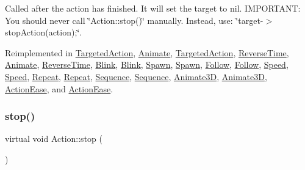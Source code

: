 Called after the action has finished. It will set the \textquotesingle{}target\textquotesingle{} to nil. I\+M\+P\+O\+R\+T\+A\+NT\+: You should never call \char`\"{}\+Action\+::stop()\char`\"{} manually. Instead, use\+: \char`\"{}target-\/$>$stop\+Action(action);\char`\"{}. 

Reimplemented in \hyperlink{classTargetedAction_a006f4ba95607369684770186588d12ce}{Targeted\+Action}, \hyperlink{classAnimate_acca8e3d000ced3182958b87e531ac423}{Animate}, \hyperlink{classTargetedAction_a688769917c245a9f885bbe49a73e37fa}{Targeted\+Action}, \hyperlink{classReverseTime_ab4fbd1a9abd412981366ae8a7782180e}{Reverse\+Time}, \hyperlink{classAnimate_a546b7b7817303ad58f57c6c97d64c4ed}{Animate}, \hyperlink{classReverseTime_af59bd73c03add3be189a371f5f338b72}{Reverse\+Time}, \hyperlink{classBlink_a081f03902fb69d5b4ec0fddf0ee72b60}{Blink}, \hyperlink{classBlink_ac2299db1e757e2911e35ee9c88fc477c}{Blink}, \hyperlink{classSpawn_a6b4b872928f24b722fda9d7428178a56}{Spawn}, \hyperlink{classSpawn_ab743d2f0b325be11b8939162d9d8984c}{Spawn}, \hyperlink{classFollow_af3b58aa360668e6e1203a48f23276b74}{Follow}, \hyperlink{classFollow_a2cd8dbd76066ecb517c6d5bdca032d6c}{Follow}, \hyperlink{classSpeed_a7580890ff2db1634273c0b726c023098}{Speed}, \hyperlink{classSpeed_afc0df0c91cfcb119182fec7ccf470f45}{Speed}, \hyperlink{classRepeat_a53b3a08574698685425cd7c55645e57a}{Repeat}, \hyperlink{classRepeat_ae7d7d020a49dbbe3ee160fe22db02ad2}{Repeat}, \hyperlink{classSequence_a66d72eff9f99dfff3f0ac09d280f4360}{Sequence}, \hyperlink{classSequence_a14332cc490ebbbb1c372eff0dc4cd025}{Sequence}, \hyperlink{classAnimate3D_af37f00e045b7dc5cd1a0c54a4f4f8042}{Animate3D}, \hyperlink{classAnimate3D_a9d27a950ce7942a73a392936951fc263}{Animate3D}, \hyperlink{classActionEase_a1a12083389f0bec7b1de3ef2c832597a}{Action\+Ease}, and \hyperlink{classActionEase_a2f9afe79f5848689a7f6f54c55764275}{Action\+Ease}.

\mbox{\label{classAction_a27eeea2acc524f112d78df187cb541d9}} 
\subsubsection{\texorpdfstring{stop()}{stop()}\hspace{0.1cm}{\footnotesize\ttfamily [2/2]}}
{\footnotesize\ttfamily virtual void Action\+::stop (\begin{DoxyParamCaption}{ }\end{DoxyParamCaption})\hspace{0.3cm}{\ttfamily [virtual]}}

